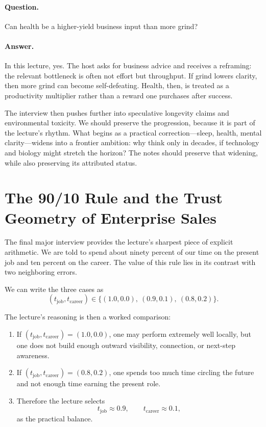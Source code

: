 \paragraph{Question.} Can health be a higher-yield business input than more grind?

\paragraph{Answer.} In this lecture, yes. The host asks for business advice and receives a reframing: the relevant bottleneck is often not effort but throughput. If grind lowers clarity, then more grind can become self-defeating. Health, then, is treated as a productivity multiplier rather than a reward one purchases after success.

The interview then pushes further into speculative longevity claims and environmental toxicity. We should preserve the progression, because it is part of the lecture's rhythm. What begins as a practical correction---sleep, health, mental clarity---widens into a frontier ambition: why think only in decades, if technology and biology might stretch the horizon? The notes should preserve that widening, while also preserving its attributed status.

\section{The 90/10 Rule and the Trust Geometry of Enterprise Sales}

The final major interview provides the lecture's sharpest piece of explicit arithmetic. We are told to spend about ninety percent of our time on the present job and ten percent on the career. The value of this rule lies in its contrast with two neighboring errors.

We can write the three cases as
\begin{equation}
(t_{\mathrm{job}},t_{\mathrm{career}})
\in
\{(1.0,0.0),\ (0.9,0.1),\ (0.8,0.2)\}.
\end{equation}

The lecture's reasoning is then a worked comparison:
\begin{enumerate}
\item If \((t_{\mathrm{job}},t_{\mathrm{career}})=(1.0,0.0)\), one may perform extremely well locally, but one does not build enough outward visibility, connection, or next-step awareness.
\item If \((t_{\mathrm{job}},t_{\mathrm{career}})=(0.8,0.2)\), one spends too much time circling the future and not enough time earning the present role.
\item Therefore the lecture selects
\begin{equation}
t_{\mathrm{job}} \approx 0.9,
\qquad
t_{\mathrm{career}} \approx 0.1,
\end{equation}
as the practical balance.
\end{enumerate}

